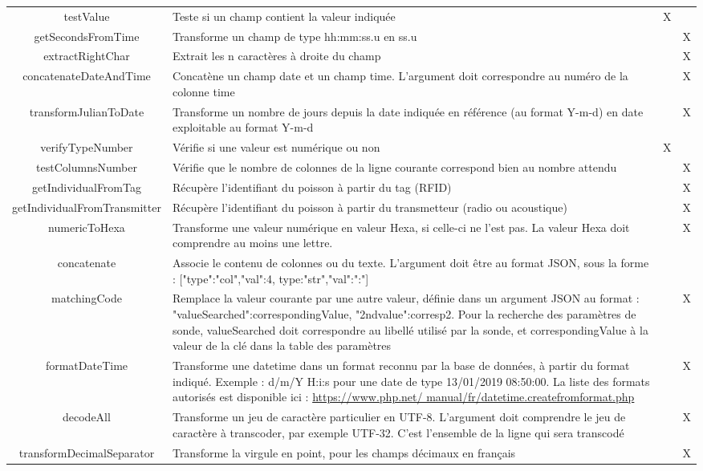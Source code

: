\begin{longtable}{|c|>{\raggedright\arraybackslash}p{5cm}|c|c|}
testValue & Teste si un champ contient la valeur indiquée & X &  \\ 
getSecondsFromTime & Transforme un champ de type hh:mm:ss.u en ss.u &  & X \\ 
extractRightChar & Extrait les n caractères à droite du champ &  & X \\ 
concatenateDateAndTime & Concatène un champ date et un champ time. L'argument doit correspondre au numéro de la colonne time &  & X \\ 
transformJulianToDate & Transforme un nombre de jours depuis la date indiquée en référence (au format Y-m-d) en date exploitable au format Y-m-d &  & X \\ 
verifyTypeNumber & Vérifie si une valeur est numérique ou non & X &  \\ 
testColumnsNumber & Vérifie que le nombre de colonnes de la ligne courante correspond bien au nombre attendu &  & X \\ 
getIndividualFromTag & Récupère l'identifiant du poisson à partir du tag (RFID) &  & X \\ 
getIndividualFromTransmitter & Récupère l'identifiant du poisson à partir du transmetteur (radio ou acoustique) &  & X \\ 
numericToHexa & Transforme une valeur numérique en valeur Hexa, si celle-ci ne l'est pas. La valeur Hexa doit comprendre au moins une lettre.  &  & X \\ 
concatenate & Associe le contenu de colonnes ou du texte. L'argument doit être au format JSON, sous la forme : [{"type":"col","val":4}, {type:"str","val":":"}] &  &  \\ 
matchingCode & Remplace la valeur courante par une autre valeur, définie dans un argument JSON au format : {"valueSearched":correspondingValue, "2ndvalue":corresp2}. Pour la recherche des paramètres de sonde, valueSearched doit correspondre au libellé utilisé par la sonde, et correspondingValue à la valeur de la clé dans la table des paramètres &  & X \\ 
formatDateTime & Transforme une datetime dans un format reconnu par la base de données, à partir du format indiqué. Exemple : d/m/Y H:i:s pour une date de type 13/01/2019 08:50:00. La liste des formats autorisés est disponible ici : \href{https://www.php.net/manual/fr/datetime.createfromformat.php}{https://www.php.net/ manual/fr/datetime.createfromformat.php}&  & X \\ 
decodeAll & Transforme un jeu de caractère particulier en UTF-8. L'argument doit comprendre le jeu de caractère à transcoder, par exemple UTF-32. C'est l'ensemble de la ligne qui sera transcodé &  & X \\ 
transformDecimalSeparator & Transforme la virgule en point, pour les champs décimaux en français &  & X \\ 
\hline 

\end{longtable}

